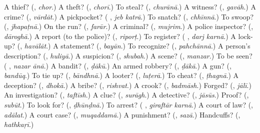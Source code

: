 \begin{tcolorbox}[breakable,colback=teal!4,colframe=teal!35!black,title={Before you move on}]
A thief? (\textbf{}, \emph{chor}.) A theft? (\textbf{}, \emph{chorī}.) To steal? (\textbf{}, \emph{churānā}.) A witness? (\textbf{}, \emph{gavāh}.) A crime? (\textbf{}, \emph{vārdāt}.) A pickpocket? (\textbf{ }, \emph{jeb katrā}.) To snatch? (\textbf{}, \emph{chhīnnā}.) To swoop? (\textbf{}, \emph{jhapaṭnā}.) On the run? (\textbf{}, \emph{farār}.) A criminal? (\textbf{}, \emph{mujrim}.) A police inspector? (\textbf{}, \emph{dāroghā}.) A report (to the police)? (\textbf{}, \emph{riporṭ}.) To register? (\textbf{ }, \emph{darj karnā}.) A lock-up? (\textbf{}, \emph{havālāt}.) A statement? (\textbf{}, \emph{bayān}.) To recognize? (\textbf{}, \emph{pahchānnā}.) A person's description? (\textbf{}, \emph{huliyā}.) A suspicion? (\textbf{}, \emph{shubah}.) A scene? (\textbf{}, \emph{manzar}.) To be seen? (\textbf{ }, \emph{nazar ānā}.) A bandit? (\textbf{}, \emph{ḍākū}.) An armed robbery? (\textbf{}, \emph{ḍākā}.) A gun? (\textbf{}, \emph{bandūq}.) To tie up? (\textbf{}, \emph{bāndhnā}.) A looter? (\textbf{}, \emph{luṭerā}.) To cheat? (\textbf{}, \emph{ṭhagnā}.) A deception? (\textbf{}, \emph{dhokā}.) A bribe? (\textbf{}, \emph{rishvat}.) A crook? (\textbf{}, \emph{badmāsh}.) Forged? (\textbf{}, \emph{jālī}.) An investigation? (\textbf{}, \emph{taftīsh}.) A clue? (\textbf{}, \emph{surāgh}.) A detective? (\textbf{}, \emph{jāsūs}.) Proof? (\textbf{}, \emph{subūt}.) To look for? (\textbf{}, \emph{ḍhūnḍnā}.) To arrest? (\textbf{ }, \emph{giraftār karnā}.) A court of law? (\textbf{}, \emph{adālat}.) A court case? (\textbf{}, \emph{muqaddamā}.) A punishment? (\textbf{}, \emph{sazā}.) Handcuffs? (\textbf{}, \emph{hathkaṛī}.)
\end{tcolorbox}
